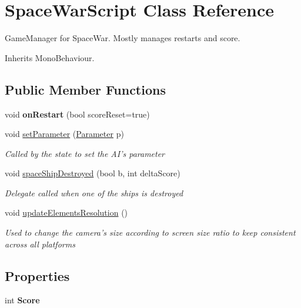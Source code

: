 \hypertarget{class_space_war_script}{\section{Space\-War\-Script Class Reference}
\label{class_space_war_script}
}


Game\-Manager for Space\-War. Mostly manages restarts and score.  




Inherits Mono\-Behaviour.

\subsection*{Public Member Functions}
\begin{DoxyCompactItemize}
\item 
\hypertarget{class_space_war_script_a4ecffd489f433ce9a9eff4b4ef40cd70}{void {\bfseries on\-Restart} (bool score\-Reset=true)}\label{class_space_war_script_a4ecffd489f433ce9a9eff4b4ef40cd70}

\item 
void \hyperlink{class_space_war_script_add8402d3fb82b35e28353374036133fc}{set\-Parameter} (\hyperlink{class_parameter}{Parameter} p)
\begin{DoxyCompactList}\small\item\em Called by the state to set the A\-I's parameter \end{DoxyCompactList}\item 
void \hyperlink{class_space_war_script_a96c8e9efa64630e61bbd418fe629aea9}{space\-Ship\-Destroyed} (bool b, int delta\-Score)
\begin{DoxyCompactList}\small\item\em Delegate called when one of the ships is destroyed \end{DoxyCompactList}\item 
void \hyperlink{class_space_war_script_a98597e04185ed14283c441a90c00e1c0}{update\-Elements\-Resolution} ()
\begin{DoxyCompactList}\small\item\em Used to change the camera's size according to screen size ratio to keep consistent across all platforms \end{DoxyCompactList}\end{DoxyCompactItemize}
\subsection*{Properties}
\begin{DoxyCompactItemize}
\item 
\hypertarget{class_space_war_script_acc55edd5813205e1eeac4846320d4ea5}{int {\bfseries Score}}\label{class_space_war_script_acc55edd5813205e1eeac4846320d4ea5}

\end{DoxyCompactItemize}


